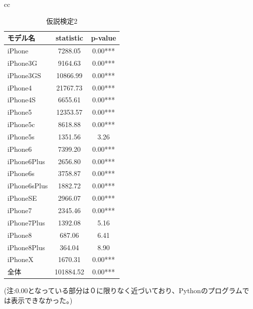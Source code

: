 \documentclass[uplatex,11pt]{jsarticle}
\begin{document}
\begin{table}[hb]
\begin{center}
\begin{tabular}{cc}
            \begin{minipage}{0.5\hsize}
                \begin{center}
                    \caption{仮説検定2}
                        \begin{tabular}{|l|cc|}
                            \hline
                            モデル名         & statistic & p-value \\ \hline
                            iPhone       & 7288.05   & 0.00***    \\
                            iPhone3G     & 9164.63   & 0.00***    \\
                            iPhone3GS    & 10866.99  & 0.00***    \\
                            iPhone4      & 21767.73  & 0.00***    \\
                            iPhone4S     & 6655.61   & 0.00***    \\
                            iPhone5      & 12353.57  & 0.00***    \\
                            iPhone5c     & 8618.88   & 0.00***    \\
                            iPhone5s     & 1351.56   & 3.26    \\
                            iPhone6      & 7399.20   & 0.00***    \\
                            iPhone6Plus  & 2656.80   & 0.00***    \\
                            iPhone6s     & 3758.87   & 0.00***    \\
                            iPhone6sPlus & 1882.72   & 0.00***    \\
                            iPhoneSE     & 2966.07   & 0.00***    \\
                            iPhone7      & 2345.46   & 0.00***    \\
                            iPhone7Plus  & 1392.08   & 5.16    \\
                            iPhone8      & 687.06    & 6.41    \\
                            iPhone8Plus  & 364.04    & 8.90    \\
                            iPhoneX      & 1670.31   & 0.00***    \\
                            全体         & 101884.52 & 0.00***  \\ \hline
                        \end{tabular}
                \end{center}
            \end{minipage}

        \end{tabular}
    \end{center}
    (注:0.00となっている部分は０に限りなく近づいており、Pythonのプログラムでは表示できなかった。)
\end{table}
\end{document}
